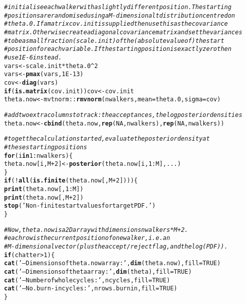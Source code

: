 \documentclass{article}\usepackage[]{graphicx}\usepackage[]{color}
\makeatletter
\newcommand{\hlnum}[1]{\textcolor[rgb]{0.686,0.059,0.569}{#1}}%
\newcommand{\hlstr}[1]{\textcolor[rgb]{0.192,0.494,0.8}{#1}}%
\newcommand{\hlcom}[1]{\textcolor[rgb]{0.678,0.584,0.686}{\textit{#1}}}%
\newcommand{\hlopt}[1]{\textcolor[rgb]{0,0,0}{#1}}%
\newcommand{\hlstd}[1]{\textcolor[rgb]{0.345,0.345,0.345}{#1}}%
\newcommand{\hlkwa}[1]{\textcolor[rgb]{0.161,0.373,0.58}{\textbf{#1}}}%
\newcommand{\hlkwb}[1]{\textcolor[rgb]{0.69,0.353,0.396}{#1}}%
\newcommand{\hlkwc}[1]{\textcolor[rgb]{0.333,0.667,0.333}{#1}}%
\newcommand{\hlkwd}[1]{\textcolor[rgb]{0.737,0.353,0.396}{\textbf{#1}}}%
\newenvironment{kframe}{%
 \def\at@end@of@kframe{}%
 \ifinner\ifhmode%
  \def\at@end@of@kframe{\end{minipage}}%
  \begin{minipage}{\columnwidth}%
 \fi\fi%
 \def\FrameCommand##1{\hskip\@totalleftmargin \hskip-\fboxsep
 \colorbox{shadecolor}{##1}\hskip-\fboxsep
     \hskip-\linewidth \hskip-\@totalleftmargin \hskip\columnwidth}%
 \MakeFramed {\advance\hsize-\width
   \@totalleftmargin\z@ \linewidth\hsize
   \@setminipage}}%
 {\par\unskip\endMakeFramed%
 \at@end@of@kframe}
\newenvironment{knitrout}{}{} %
\makeatother
\begin{document}
\begin{knitrout}
\begin{kframe}
\begin{alltt}
  \hlcom{# initialise each walker with a slightly different position. The starting }
  \hlcom{# positions are randomised using a M-dimensional t distribution centred on }
  \hlcom{# theta.0. If a matrix cov.init is supplied then use this as the covariance }
  \hlcom{# matrix. Otherwise create a diagonal covariance matrix and set the variances }
  \hlcom{# to be a small fraction (scale.init) of the (absolute value of) the start }
  \hlcom{# position for each variable. If the starting position is exactly zero then }
  \hlcom{# use 1E-6 instead.}
  \hlstd{vars} \hlkwb{<-} \hlstd{scale.init} \hlopt{*} \hlstd{theta.0}\hlopt{^}\hlnum{2}
  \hlstd{vars} \hlkwb{<-} \hlkwd{pmax}\hlstd{(vars,} \hlnum{1E-13}\hlstd{)}
  \hlstd{cov} \hlkwb{<-} \hlkwd{diag}\hlstd{(vars)}
  \hlkwa{if} \hlstd{(}\hlkwd{is.matrix}\hlstd{(cov.init)) cov} \hlkwb{<-} \hlstd{cov.init}
  \hlstd{theta.now} \hlkwb{<-} \hlstd{mvtnorm}\hlopt{::}\hlkwd{rmvnorm}\hlstd{(nwalkers,} \hlkwc{mean}\hlstd{=theta.0,} \hlkwc{sigma}\hlstd{=cov)}

  \hlcom{# add two extra columns to track: the acceptances, the log posterior densities}
  \hlstd{theta.now} \hlkwb{<-} \hlkwd{cbind}\hlstd{(theta.now,} \hlkwd{rep}\hlstd{(}\hlnum{NA}\hlstd{, nwalkers),} \hlkwd{rep}\hlstd{(}\hlnum{NA}\hlstd{, nwalkers))}

  \hlcom{# to get the calculation started, evaluate the posterior density at}
  \hlcom{# these starting positions}
  \hlkwa{for} \hlstd{(i} \hlkwa{in} \hlnum{1}\hlopt{:}\hlstd{nwalkers) \{}
    \hlstd{theta.now[i, M}\hlopt{+}\hlnum{2}\hlstd{]} \hlkwb{<-} \hlkwd{posterior}\hlstd{(theta.now[i,} \hlnum{1}\hlopt{:}\hlstd{M], ...)}
  \hlstd{\}}
  \hlkwa{if} \hlstd{(}\hlopt{!}\hlkwd{all}\hlstd{(}\hlkwd{is.finite}\hlstd{(theta.now[,M}\hlopt{+}\hlnum{2}\hlstd{]))) \{}
    \hlkwd{print}\hlstd{(theta.now[,}\hlnum{1}\hlopt{:}\hlstd{M])}
    \hlkwd{print}\hlstd{(theta.now[,M}\hlopt{+}\hlnum{2}\hlstd{])}
    \hlkwd{stop}\hlstd{(}\hlstr{'Non-finite start values for target PDF.'}\hlstd{)}
  \hlstd{\}}

  \hlcom{# Now, theta.now is a 2D array with dimensions nwalkers * M+2.}
  \hlcom{# each row is the current position of one walker, i.e. an}
  \hlcom{# M-dimensional vector (plus the accept/reject flag, and the log(PDF)).}
  \hlkwa{if} \hlstd{(chatter} \hlopt{>} \hlnum{1}\hlstd{) \{}
    \hlkwd{cat}\hlstd{(}\hlstr{'-- Dimensions of theta.now array:'}\hlstd{,} \hlkwd{dim}\hlstd{(theta.now),} \hlkwc{fill}\hlstd{=}\hlnum{TRUE}\hlstd{)}
    \hlkwd{cat}\hlstd{(}\hlstr{'-- Dimensions of theta array:    '}\hlstd{,} \hlkwd{dim}\hlstd{(theta),} \hlkwc{fill}\hlstd{=}\hlnum{TRUE}\hlstd{)}
    \hlkwd{cat}\hlstd{(}\hlstr{'-- Number of whole cycles:       '}\hlstd{, ncycles,} \hlkwc{fill}\hlstd{=}\hlnum{TRUE}\hlstd{)}
    \hlkwd{cat}\hlstd{(}\hlstr{'-- No. burn-in cycles:           '}\hlstd{, nrows.burnin,} \hlkwc{fill}\hlstd{=}\hlnum{TRUE}\hlstd{)}
  \hlstd{\}}


\end{alltt}
\end{kframe}
\end{knitrout}
\end{document}
